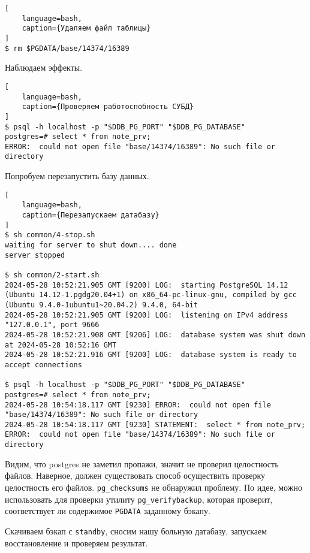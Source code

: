 \documentclass{article}
\begin{document}
\begin{lstlisting}[
    language=bash,
    caption={Удаляем файл таблицы}
]
$ rm $PGDATA/base/14374/16389

\end{lstlisting}

Наблюдаем эффекты.

\begin{lstlisting}[
    language=bash,
    caption={Проверяем работоспобность СУБД}
]
$ psql -h localhost -p "$DDB_PG_PORT" "$DDB_PG_DATABASE"
postgres=# select * from note_prv;
ERROR:  could not open file "base/14374/16389": No such file or directory
\end{lstlisting}

Попробуем перезапустить базу данных.

\begin{lstlisting}[
    language=bash,
    caption={Перезапускаем датабазу}
]
$ sh common/4-stop.sh
waiting for server to shut down.... done
server stopped

$ sh common/2-start.sh
2024-05-28 10:52:21.905 GMT [9200] LOG:  starting PostgreSQL 14.12 (Ubuntu 14.12-1.pgdg20.04+1) on x86_64-pc-linux-gnu, compiled by gcc (Ubuntu 9.4.0-1ubuntu1~20.04.2) 9.4.0, 64-bit
2024-05-28 10:52:21.905 GMT [9200] LOG:  listening on IPv4 address "127.0.0.1", port 9666
2024-05-28 10:52:21.908 GMT [9206] LOG:  database system was shut down at 2024-05-28 10:52:16 GMT
2024-05-28 10:52:21.916 GMT [9200] LOG:  database system is ready to accept connections

$ psql -h localhost -p "$DDB_PG_PORT" "$DDB_PG_DATABASE"
postgres=# select * from note_prv;
2024-05-28 10:54:18.117 GMT [9230] ERROR:  could not open file "base/14374/16389": No such file or directory
2024-05-28 10:54:18.117 GMT [9230] STATEMENT:  select * from note_prv;
ERROR:  could not open file "base/14374/16389": No such file or directory
\end{lstlisting}

Видим, что postgres не заметил пропажи, значит не проверил целостность файлов. Наверное, должен существовать способ осуществить проверку целостность его файлов. \texttt{pg\_checksums} не обнаружил проблему. По идее, можно использовать для проверки утилиту \texttt{pg\_verifybackup}, которая проверит, соответствует ли содержимое \texttt{PGDATA} заданному бэкапу.

Скачиваем бэкап с \texttt{standby}, сносим нашу больную датабазу, запускаем восстановление и проверяем результат.
\end{document}
